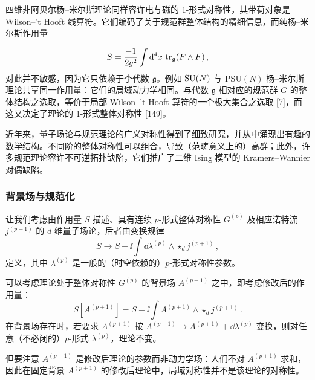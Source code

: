 \begin{remark}[17.13] 四维非阿贝尔杨–米尔斯理论同样容许电与磁的 1-形式对称性，其带荷对象是 Wilson–'t Hooft 线算符。它们编码了关于规范群整体结构的精细信息，而纯杨–米尔斯作用量


\[
S=\frac{-1}{2g^2}\int \mathrm{d}^4x\,\operatorname{tr}_{\mathfrak{g}}(F\wedge F)\,,
\]
对此并不敏感，因为它只依赖于李代数 $\mathfrak{g}$。例如 $\operatorname{SU}(N)$ 与 $\mathrm{PSU}(N)$ 杨–米尔斯理论共享同一作用量：它们的局域动力学相同。与代数 $\mathfrak{g}$ 相对应的规范群 $G$ 的整体结构之选取，等价于局部 Wilson–'t Hooft 算符的一个极大集合之选取 [7]，而这又决定了理论的 1-形式整体对称性 [149]。\end{remark}

近年来，量子场论与规范理论的广义对称性得到了细致研究，并从中涌现出有趣的数学结构。不同阶的整体对称性可以组合，导致（范畴意义上的）高群；此外，许多规范理论容许不可逆拓扑缺陷，它们推广了二维 Ising 模型的 Kramers–Wannier 对偶缺陷。

\subsubsection*{背景场与规范化}

让我们考虑由作用量 $S$ 描述、具有连续 $p$-形式整体对称性 $G^{(p)}$ 及相应诺特流 $j^{(p+1)}$ 的 $d$ 维量子场论，后者由变换规律
\begin{equation}
S\to S+\ii\int \dd\lambda^{(p)}\wedge\star_d j^{(p+1)}\,,
\tag{17.6}
\end{equation}
定义，其中 $\lambda^{(p)}$ 是一般的（时空依赖的）$p$-形式对称性参数。

可以考虑理论处于整体对称性 $G^{(p)}$ 的背景场 $A^{(p+1)}$ 之中，即考虑修改后的作用量：
\begin{equation}
S[A^{(p+1)}]=S-\ii\int A^{(p+1)}\wedge\star_d j^{(p+1)}\,.
\tag{17.7}
\end{equation}
在背景场存在时，若要求 $A^{(p+1)}$ 按 $A^{(p+1)}\to A^{(p+1)}+\dd\lambda^{(p)}$ 变换，则对任意（不必闭的）$p$-形式 $\lambda^{(p)}$，理论不变。

但要注意 $A^{(p+1)}$ 是修改后理论的参数而非动力学场：人们不对 $A^{(p+1)}$ 求和，因此在固定背景 $A^{(p+1)}$ 的修改后理论中，局域对称性并不是该理论的对称性。

